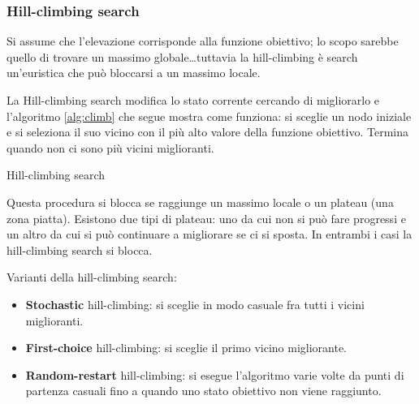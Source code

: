 \subsubsection{Hill-climbing search}

Si assume che l'elevazione corrisponde alla funzione obiettivo; lo scopo
sarebbe quello di trovare un massimo globale\dots tuttavia la hill-climbing
è search un'euristica che può bloccarsi a un massimo locale.

La Hill-climbing search modifica lo stato corrente cercando di migliorarlo e
l'algoritmo \ref{alg:climb} che segue mostra come funziona: si sceglie un nodo
iniziale e si seleziona il suo vicino con il più alto valore della funzione
obiettivo. Termina quando non ci sono più vicini miglioranti.

\begin{algorithm}
    \caption{Hill-climbing search}
    \label{alg:climb}
    \begin{algorithmic}[1]
         
            \Loop
              \EndIf
            \EndLoop
        \EndProcedure
    \end{algorithmic}
\end{algorithm}

Questa procedura si blocca se raggiunge un massimo locale o un plateau (una zona
piatta).
Esistono due tipi di plateau: uno da cui non si può fare progressi e un
altro da cui si può continuare a migliorare se ci si sposta. In entrambi i casi
la hill-climbing search si blocca.

Varianti della hill-climbing search:

\begin{itemize}
 \item \textbf{Stochastic} hill-climbing: si sceglie in modo casuale fra
tutti i vicini miglioranti.
 \item \textbf{First-choice} hill-climbing: si sceglie il primo vicino
migliorante.
 \item \textbf{Random-restart} hill-climbing: si esegue l'algoritmo varie volte
da punti di partenza casuali fino a quando uno stato obiettivo non viene
raggiunto.
\end{itemize}

